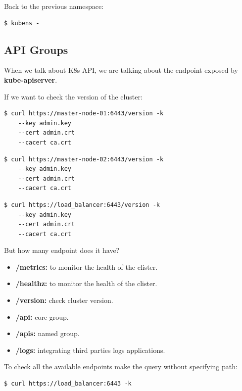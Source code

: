 \documentclass{article}
\newenvironment{codetemplate}[1][]{%
  \mybasecolorbox[#1]
  \itshape
}{%
  \endmybasecolorbox
}
\begin{document}
Back to the previous namespace:
\begin{codetemplate}{}
\begin{verbatim}
$ kubens -
\end{verbatim}
\end{codetemplate}

\subsection{API Groups}
When we talk about K8s API, we are talking about the endpoint exposed by \textbf{kube-apiserver}.

If we want to check the version of the cluster:
\begin{codetemplate}{}
\begin{verbatim}
$ curl https://master-node-01:6443/version -k
    --key admin.key
    --cert admin.crt
    --cacert ca.crt
\end{verbatim}
\end{codetemplate}
\begin{codetemplate}{}
\begin{verbatim}
$ curl https://master-node-02:6443/version -k
    --key admin.key
    --cert admin.crt
    --cacert ca.crt
\end{verbatim}
\end{codetemplate}
\begin{codetemplate}{}
\begin{verbatim}
$ curl https://load_balancer:6443/version -k
    --key admin.key
    --cert admin.crt
    --cacert ca.crt
\end{verbatim}
\end{codetemplate}

But how many endpoint does it have?
\begin{itemize}
    \item \textbf{/metrics:} to monitor the health of the clister.
    \item \textbf{/healthz:} to monitor the health of the clister.
    \item \textbf{/version:} check cluster version.
    \item \textbf{/api:} core group.
    \item \textbf{/apis:} named group.
    \item \textbf{/logs:} integrating third parties logs applications.
\end{itemize}

To check all the available endpoints make the query without specifying path:
\begin{codetemplate}{}
\begin{verbatim}
$ curl https://load_balancer:6443 -k
\end{verbatim}
\end{codetemplate}
\end{document}
